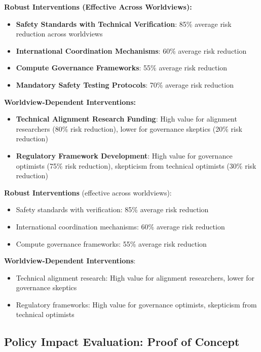 \documentclass[
  11pt,
  letterpaper,
]{book}
\providecommand{\tightlist}{%
  \setlength{\itemsep}{0pt}\setlength{\parskip}{0pt}}
\begin{document}
\textbf{Robust Interventions (Effective Across Worldviews):}

\begin{itemize}
\tightlist
\item
  \textbf{Safety Standards with Technical Verification}: 85\% average
  risk reduction across worldviews
\item
  \textbf{International Coordination Mechanisms}: 60\% average risk
  reduction
\item
  \textbf{Compute Governance Frameworks}: 55\% average risk reduction
\item
  \textbf{Mandatory Safety Testing Protocols}: 70\% average risk
  reduction
\end{itemize}

\textbf{Worldview-Dependent Interventions:}

\begin{itemize}
\tightlist
\item
  \textbf{Technical Alignment Research Funding}: High value for
  alignment researchers (80\% risk reduction), lower for governance
  skeptics (20\% risk reduction)
\item
  \textbf{Regulatory Framework Development}: High value for governance
  optimists (75\% risk reduction), skepticism from technical optimists
  (30\% risk reduction)
\end{itemize}

\textbf{Robust Interventions} (effective across worldviews):

\begin{itemize}
\tightlist
\item
  Safety standards with verification: 85\% average risk reduction
\item
  International coordination mechanisms: 60\% average risk reduction
\item
  Compute governance frameworks: 55\% average risk reduction
\end{itemize}

\textbf{Worldview-Dependent Interventions}:

\begin{itemize}
\tightlist
\item
  Technical alignment research: High value for alignment researchers,
  lower for governance skeptics
\item
  Regulatory frameworks: High value for governance optimists, skepticism
  from technical optimists
\end{itemize}

\subsection{Policy Impact Evaluation: Proof of
Concept}\label{sec-policy-impact}
\end{document}
